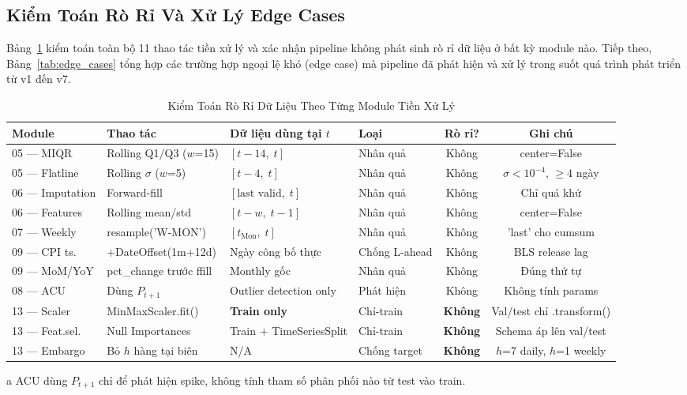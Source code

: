 \documentclass[conference]{IEEEtran}
\begin{document}
\subsection{Kiểm Toán Rò Rỉ Và Xử Lý Edge Cases}
Bảng~\ref{tab:leakage_audit} kiểm toán toàn bộ 11 thao tác tiền xử lý và xác
nhận pipeline không phát sinh rò rỉ dữ liệu ở bất kỳ module nào. Tiếp theo,
Bảng~\ref{tab:edge_cases} tổng hợp các trường hợp ngoại lệ khó (edge case) mà
pipeline đã phát hiện và xử lý trong suốt quá trình phát triển từ v1 đến v7.
\begin{table}[t]
\caption{Kiểm Toán Rò Rỉ Dữ Liệu Theo Từng Module Tiền Xử Lý}
\label{tab:leakage_audit}
\centering
\begin{threeparttable}
\begin{tabular}{@{}llllcc@{}}
\toprule
\textbf{Module} & \textbf{Thao tác} & \textbf{Dữ liệu dùng tại $t$}
  & \textbf{Loại} & \textbf{Rò rỉ?} & \textbf{Ghi chú} \\
\midrule
05 --- MIQR      & Rolling Q1/Q3 ($w$=15)   & $[t{-}14,\;t]$             & Nhân quả     & Không & center=False \\
05 --- Flatline  & Rolling $\sigma$ ($w$=5)  & $[t{-}4,\;t]$              & Nhân quả     & Không & $\sigma < 10^{-4}$, $\geq 4$ ngày \\
06 --- Imputation& Forward-fill             & $[\text{last valid},\;t]$  & Nhân quả     & Không & Chỉ quá khứ \\
06 --- Features  & Rolling mean/std          & $[t{-}w,\;t{-}1]$          & Nhân quả     & Không & center=False \\
07 --- Weekly    & resample('W-MON')         & $[t_\text{Mon},\;t]$       & Nhân quả     & Không & 'last' cho cumsum \\
09 --- CPI ts.   & +DateOffset(1m+12d)       & Ngày công bố thực          & Chống L-ahead& Không & BLS release lag \\
09 --- MoM/YoY   & pct\_change trước ffill  & Monthly gốc                & Nhân quả     & Không & Đúng thứ tự \\
08 --- ACU       & Dùng $P_{t+1}$           & Outlier detection only     & Phát hiện    & Không\tnote{a} & Không tính params \\
13 --- Scaler    & MinMaxScaler.fit()        & \textbf{Train only}        & Chỉ-train    & \textbf{Không} & Val/test chỉ .transform() \\
13 --- Feat.sel. & Null Importances          & Train + TimeSeriesSplit    & Chỉ-train    & \textbf{Không} & Schema áp lên val/test \\
13 --- Embargo   & Bỏ $h$ hàng tại biên     & N/A                        & Chống target & \textbf{Không} & $h$=7 daily, $h$=1 weekly \\
\bottomrule
\end{tabular}
\begin{tablenotes}
\footnotesize
\item[a] ACU dùng $P_{t+1}$ chỉ để phát hiện spike,
không tính tham số phân phối nào từ test vào train.
\end{tablenotes}
\end{threeparttable}
\end{table}
\end{document}
